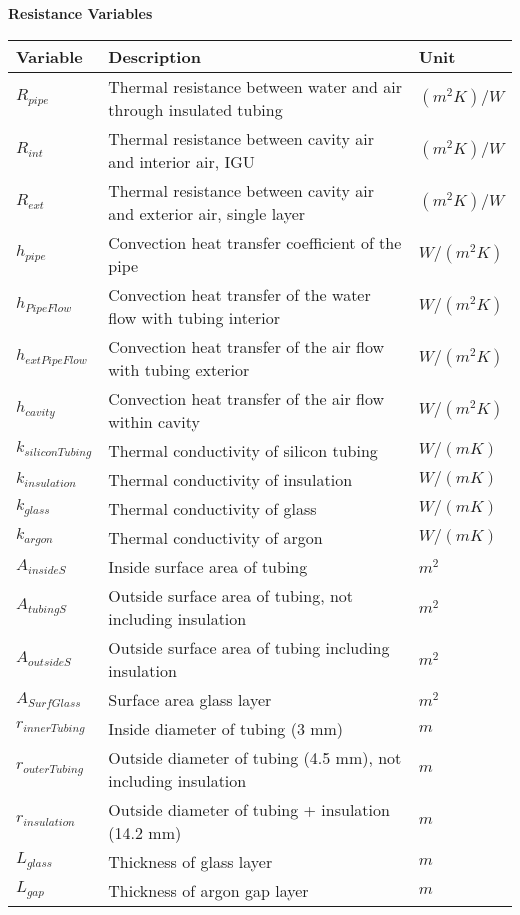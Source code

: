 \documentclass[12pt]{report}
\begin{document}
\begin{center}
	\textbf{Resistance Variables}
	\begin{tabular}{| l | l | l |}
		\hline
		Variable & Description & Unit  \\ \hline
		$R_{pipe}$ & Thermal resistance between water and air through insulated tubing & $(m^2 K)/W$ \\ \hline
		$R_{int}$ & Thermal resistance between cavity air and interior air, IGU & $(m^2 K)/W$ \\ \hline
		$R_{ext}$ & Thermal resistance between cavity air and exterior air, single layer & $(m^2 K)/W$ \\ \hline
		$h_{pipe}$ & Convection heat transfer coefficient of the pipe & $W/(m^2 K)$ \\ \hline
		$h_{PipeFlow}$ & Convection heat transfer of the water flow with tubing interior & $W/(m^2 K)$ \\ \hline
		$h_{extPipeFlow}$ & Convection heat transfer of the air flow with tubing exterior & $W/(m^2 K)$ \\ \hline
		$h_{cavity}$ & Convection heat transfer of the air flow within cavity & $W/(m^2 K)$ \\ \hline
		$k_{siliconTubing}$ & Thermal conductivity of silicon tubing & $W/(m K)$ \\ \hline
		$k_{insulation}$ & Thermal conductivity of insulation & $W/(m K)$ \\ \hline
		$k_{glass}$ & Thermal conductivity of glass & $W/(m K)$ \\ \hline
		$k_{argon}$ & Thermal conductivity of argon & $W/(m K)$ \\ \hline
		$A_{insideS}$ & Inside surface area of tubing & $m^2$ \\ \hline
		$A_{tubingS}$ & Outside surface area of tubing, not including insulation & $m^2$ \\ \hline
		$A_{outsideS}$ & Outside surface area of tubing including insulation & $m^2$ \\ \hline
		$A_{SurfGlass}$ & Surface area glass layer & $m^2$ \\ \hline
		$r_{innerTubing}$ & Inside diameter of tubing (3 mm) & $m$ \\ \hline
		$r_{outerTubing}$ & Outside diameter of tubing (4.5 mm), not including insulation & $m$ \\ \hline
		$r_{insulation}$ & Outside diameter of tubing + insulation (14.2 mm) & $m$ \\ \hline
		$L_{glass}$ & Thickness of glass layer & $m$ \\ \hline
		$L_{gap}$ & Thickness of argon gap layer & $m$ \\ \hline
	\end{tabular}
\end{center}
\end{document}
